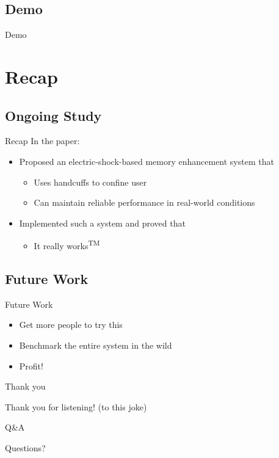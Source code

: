 \documentclass{beamer}
\begin{document}
\subsection{Demo}
\begin{frame}{Demo}
\end{frame}
\section{Recap}
\subsection{Ongoing Study}
\begin{frame}{Recap}
  In the paper:
  \begin{itemize}
    \item Proposed an electric-shock-based memory enhancement system that
    \begin{itemize}
      \item Uses handcuffs to confine user
      \item Can maintain reliable performance in real-world conditions
    \end{itemize}
    \item Implemented such a system and proved that
    \begin{itemize}
      \item It really works\textsuperscript{TM}
    \end{itemize}
  \end{itemize}
\end{frame}
\subsection{Future Work}
\begin{frame}{Future Work}
  \begin{itemize}
    \item Get more people to try this
    \item Benchmark the entire system in the wild
    \item Profit!
  \end{itemize}
\end{frame}
\begin{frame}{Thank you}
  \begin{center}
    \Huge Thank you for listening! (to this joke)
  \end{center}
\end{frame}
\begin{frame}{Q\&A}
  \begin{center}
    \Huge Questions?
  \end{center}
\end{frame}
\end{document}
